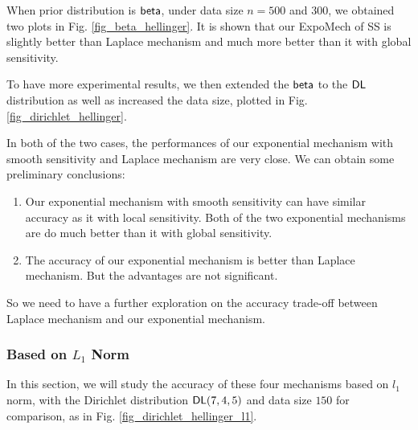 When prior distribution is $\mathsf{beta}$, under data size $n = 500$ and $300$, we obtained two plots in Fig. \ref{fig_beta_hellinger}. It is shown that our ExpoMech of SS is slightly better than Laplace mechanism and much more better than it with global sensitivity.

To have more experimental results, we then extended the $\mathsf{beta}$ to the $\mathsf{DL}$ distribution as well as increased the data size, plotted in Fig. \ref{fig_dirichlet_hellinger}.

In both of the two cases, the performances of our exponential mechanism with smooth sensitivity and Laplace mechanism are very close. We can obtain some preliminary conclusions: 
\begin{enumerate}
	\item Our exponential mechanism with smooth sensitivity can have similar accuracy as it with local sensitivity. Both of the two exponential mechanisms are do much better than it with global sensitivity.
	\item The accuracy of our exponential mechanism is better than Laplace mechanism. But the advantages are not significant.
\end{enumerate} 

So we need to have a further exploration on the accuracy trade-off between Laplace mechanism and our exponential mechanism.

\subsubsection{Based on $L_1$ Norm}
\label{subsec_accuracy_l1}
In this section, we will study the accuracy of these four mechanisms based on $l_1$ norm, with the Dirichlet distribution $\mathsf{DL}(7,4,5)$ and data size $150$ for comparison, as in Fig. \ref{fig_dirichlet_hellinger_l1}.

